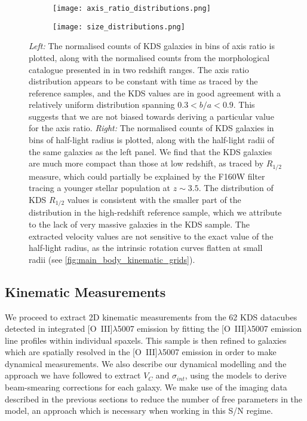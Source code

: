 \documentclass[fleqn,usenatbib]{mn2e}
\begin{document}
\begin{figure*}
    \centering \hspace{-2.0cm}
    \begin{subfigure}[h!]{0.50\textwidth}
        \centering
        \texttt{[image: axis\_ratio\_distributions.png]}
    \end{subfigure} \hspace{0.4cm}
    \begin{subfigure}[h!]{0.50\textwidth}
        \centering
        \texttt{[image: size\_distributions.png]}
    \end{subfigure}
    \caption{{\it Left:} The normalised counts of KDS galaxies in bins of axis ratio is plotted, along with the normalised counts from the morphological catalogue presented in \protect\cite{VanderWel2012} in two redshift ranges.
    The axis ratio distribution appears to be constant with time as traced by the reference samples, and the KDS values are in good agreement with a relatively uniform distribution spanning $0.3 < b/a < 0.9$.
    This suggests that we are not biased towards deriving a particular value for the axis ratio.
    {\it Right:} The normalised counts of KDS galaxies in bins of half-light radius is plotted, along with the half-light radii of the same \protect\cite{VanderWel2012} galaxies as the left panel.
    We find that the KDS galaxies are much more compact than those at low redshift, as traced by $R_{1/2}$ measure, which could partially be explained by the F160W filter tracing a younger stellar population at $z\sim3.5$.
    The distribution of KDS $R_{1/2}$ values is consistent with the smaller part of the distribution in the high-redshift reference sample, which we attribute to the lack of very massive galaxies in the KDS sample.
    The extracted velocity values are not sensitive to the exact value of the half-light radius, as the intrinsic rotation curves flatten at small radii (see \protect\ref{fig:main_body_kinematic_grids}).}
    \label{fig:morpho-distributions}
\end{figure*}

\subsection{Kinematic Measurements}\label{subsection:kinematic_measurements}

We proceed to extract 2D kinematic measurements from the 62 KDS datacubes detected in integrated [O~{\sc III}]$\lambda$5007 emission by fitting the [O~{\sc III}]$\lambda$5007 emission line profiles within individual spaxels.
This sample is then refined to galaxies which are spatially resolved in the [O~{\sc III}]$\lambda$5007 emission in order to make dynamical measurements.
We also describe our dynamical modelling and the approach we have followed to extract $V_{C}$ and $\sigma_{int}$, using the models to derive beam-smearing corrections for each galaxy.
We make use of the imaging data described in the previous sections to reduce the number of free parameters in the model, an approach which is necessary when working in this S/N regime.  
\end{document}

